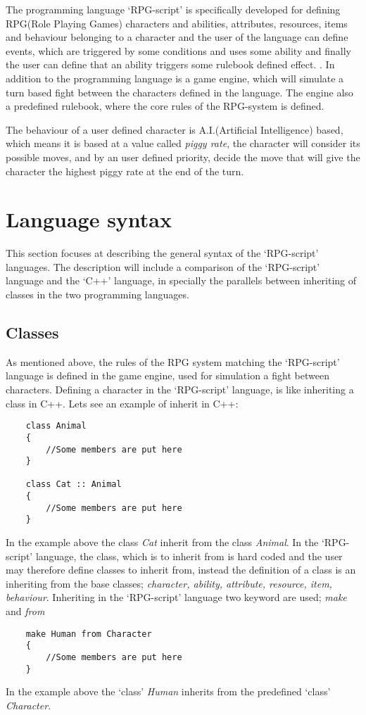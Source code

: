 The programming language `RPG-script' is specifically developed for defining RPG(Role Playing Games) characters and abilities, attributes, resources, items and behaviour belonging to a character and the user of the language can define events, which are triggered by some conditions and uses some ability and finally the user can define that an ability triggers some rulebook defined effect. . 
In addition to the programming language is a game engine, which will simulate a turn based fight between the characters defined in the language. The engine also a predefined rulebook, where the core rules of the RPG-system is defined. 

The behaviour of a user defined character is A.I.(Artificial Intelligence) based, which means it is based at a value called \emph{piggy rate}, the character will consider its possible moves, and by an user defined priority, decide the move that will give the character the highest piggy rate at the end of the turn.

\section{Language syntax}
This section focuses at describing the general syntax of the `RPG-script' languages. The description will include a comparison of the `RPG-script' language and the `C++' language, in specially the parallels between inheriting of classes in the two programming languages. 

\subsection{Classes}
As mentioned above, the rules of the RPG system matching the `RPG-script' language is defined in the game engine, used for simulation a fight between characters.
Defining a character in the `RPG-script' language, is like inheriting a class in C++.
Lets see an example of inherit in C++:
\begin{lstlisting}
	class Animal
	{
		//Some members are put here
	}
	
	class Cat :: Animal
	{
		//Some members are put here
	}
\end{lstlisting}
In the example above the class \emph{Cat} inherit from the class \emph{Animal}. In the `RPG-script' language, the class, which is to inherit from is hard coded and the user may therefore define classes to inherit from, instead the definition of a class is an inheriting from the base classes; \emph{character, ability, attribute, resource, item, behaviour}.
Inheriting in the `RPG-script' language two keyword are used; \emph{make} and \emph{from}
\begin{lstlisting}
	make Human from Character
	{
		//Some members are put here
	}
\end{lstlisting}
In the example above the `class' \emph{Human} inherits from the predefined `class' \emph{Character}.

